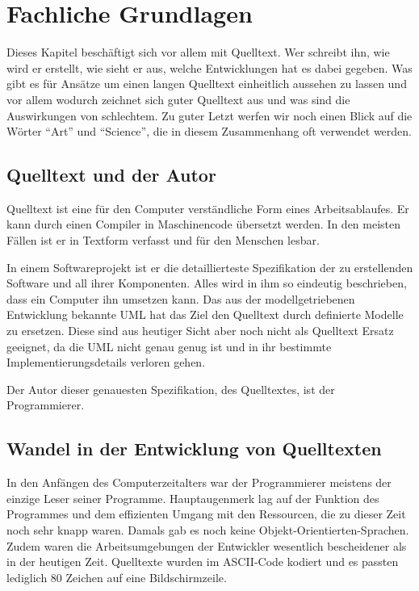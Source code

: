 
\section{Fachliche Grundlagen}

Dieses Kapitel beschäftigt sich vor allem mit Quelltext. Wer schreibt ihn, wie wird er erstellt, wie sieht er aus, welche Entwicklungen hat es dabei gegeben. Was gibt es für Ansätze um einen langen Quelltext einheitlich aussehen zu lassen und vor allem wodurch zeichnet sich guter Quelltext aus und was sind die Auswirkungen von schlechtem. Zu guter Letzt werfen wir noch einen Blick auf die Wörter \enquote{Art} und \enquote{Science}, die in diesem Zusammenhang oft verwendet werden.

\subsection{Quelltext und der Autor}

Quelltext ist eine für den Computer verständliche Form
eines Arbeitsablaufes. Er kann durch einen Compiler in Maschinencode übersetzt werden.
In den meisten Fällen ist er in Textform verfasst und für den Menschen lesbar.

In einem Softwareprojekt ist er die detaillierteste Spezifikation der zu erstellenden
Software und all ihrer Komponenten. Alles wird in ihm so eindeutig beschrieben,
dass ein Computer ihn umsetzen kann. Das aus der modellgetriebenen Entwicklung
bekannte UML hat das Ziel den Quelltext durch definierte Modelle zu ersetzen.
Diese sind aus heutiger Sicht aber noch nicht als Quelltext Ersatz geeignet,
da die UML nicht genau genug ist und in ihr bestimmte Implementierungsdetails verloren gehen.
 \cite[S. 26]{Martin}

Der Autor dieser genauesten Spezifikation, des Quelltextes, ist der Programmierer.

\subsection{Wandel in der Entwicklung von Quelltexten}


In den Anfängen des Computerzeitalters war der Programmierer meistens der einzige
Leser seiner Programme. Hauptaugenmerk lag auf der Funktion des Programmes
und dem effizienten Umgang mit den Ressourcen, die zu dieser Zeit noch sehr knapp waren.
 Damals gab es noch keine Objekt-Orientierten-Sprachen. Zudem waren die Arbeitsumgebungen der Entwickler
wesentlich bescheidener als in der heutigen Zeit. Quelltexte wurden im ASCII-Code
kodiert und es passten lediglich 80 Zeichen auf eine Bildschirmzeile.

